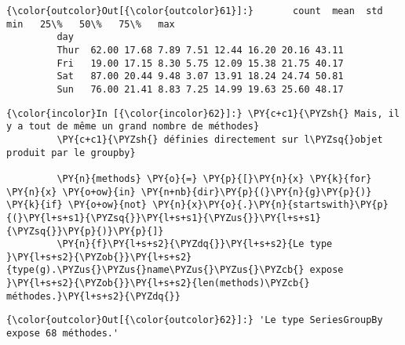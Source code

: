 \begin{Verbatim}[commandchars=\\\{\},frame=single,framerule=0.3mm,rulecolor=\color{cellframecolor}]
{\color{outcolor}Out[{\color{outcolor}61}]:}       count  mean  std  min   25\%   50\%   75\%   max
         day                                                
         Thur  62.00 17.68 7.89 7.51 12.44 16.20 20.16 43.11
         Fri   19.00 17.15 8.30 5.75 12.09 15.38 21.75 40.17
         Sat   87.00 20.44 9.48 3.07 13.91 18.24 24.74 50.81
         Sun   76.00 21.41 8.83 7.25 14.99 19.63 25.60 48.17
\end{Verbatim}
            
    \begin{Verbatim}[commandchars=\\\{\},frame=single,framerule=0.3mm,rulecolor=\color{cellframecolor}]
{\color{incolor}In [{\color{incolor}62}]:} \PY{c+c1}{\PYZsh{} Mais, il y a tout de même un grand nombre de méthodes}
         \PY{c+c1}{\PYZsh{} définies directement sur l\PYZsq{}objet produit par le groupby}
         
         \PY{n}{methods} \PY{o}{=} \PY{p}{[}\PY{n}{x} \PY{k}{for} \PY{n}{x} \PY{o+ow}{in} \PY{n+nb}{dir}\PY{p}{(}\PY{n}{g}\PY{p}{)} \PY{k}{if} \PY{o+ow}{not} \PY{n}{x}\PY{o}{.}\PY{n}{startswith}\PY{p}{(}\PY{l+s+s1}{\PYZsq{}}\PY{l+s+s1}{\PYZus{}}\PY{l+s+s1}{\PYZsq{}}\PY{p}{)}\PY{p}{]}
         \PY{n}{f}\PY{l+s+s2}{\PYZdq{}}\PY{l+s+s2}{Le type }\PY{l+s+s2}{\PYZob{}}\PY{l+s+s2}{type(g).\PYZus{}\PYZus{}name\PYZus{}\PYZus{}\PYZcb{} expose }\PY{l+s+s2}{\PYZob{}}\PY{l+s+s2}{len(methods)\PYZcb{} méthodes.}\PY{l+s+s2}{\PYZdq{}}
\end{Verbatim}


\begin{Verbatim}[commandchars=\\\{\},frame=single,framerule=0.3mm,rulecolor=\color{cellframecolor}]
{\color{outcolor}Out[{\color{outcolor}62}]:} 'Le type SeriesGroupBy expose 68 méthodes.'
\end{Verbatim}
            
